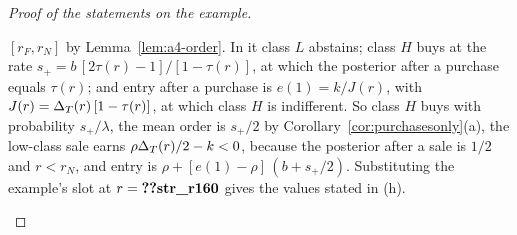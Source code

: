 \begin{proof}[Proof of the statements on the example]
\begin{enumerate}[label=(\alph*),leftmargin=2em]
\([r_F,r_N]\) by Lemma~\ref{lem:a4-order}. In it class \(L\) abstains; class \(H\) buys at the rate
\(s_+=b\,[2\tau(r)-1]/[1-\tau(r)]\), at which the posterior after a purchase equals \(\tau(r)\); and entry after a
purchase is \(e(1)=k/J(r)\), with \(J(r)=\Delta_T(r)\,[1-\tau(r)]\), at which class \(H\) is indifferent. So class \(H\) buys
with probability \(s_+/\lambda\), the mean order is \(s_+/2\) by Corollary~\ref{cor:purchasesonly}(a), the low-class sale
earns \(\rho\Delta_T(r)/2-k<0\), because the posterior after a sale is \(1/2\) and \(r<r_N\), and entry is
\(\rho+[e(1)-\rho]\,(b+s_+/2)\). Substituting the example's slot at \(r=\reg{str_r160}\) gives the values stated in (h).\qedhere
\end{enumerate}
\end{proof}
